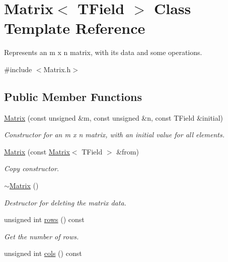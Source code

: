 \hypertarget{classMatrix}{}\section{Matrix$<$ T\+Field $>$ Class Template Reference}
\label{classMatrix}


Represents an m x n matrix, with its data and some operations.  




{\ttfamily \#include $<$Matrix.\+h$>$}

\subsection*{Public Member Functions}
\begin{DoxyCompactItemize}
\item 
\mbox{\hyperlink{classMatrix_aaf53d2ed43916bdff67dde343acc2d9a}{Matrix}} (const unsigned \&m, const unsigned \&n, const T\+Field \&initial)
\begin{DoxyCompactList}\small\item\em Constructor for an m x n matrix, with an initial value for all elements. \end{DoxyCompactList}\item 
\mbox{\hyperlink{classMatrix_ac6bf5bf423a6d56ce31e8659de788c54}{Matrix}} (const \mbox{\hyperlink{classMatrix}{Matrix}}$<$ T\+Field $>$ \&from)
\begin{DoxyCompactList}\small\item\em Copy constructor. \end{DoxyCompactList}\item 
\mbox{\label{classMatrix_a3474dab2c6b05e89bdfaf3270e5081ec}} 
\mbox{\hyperlink{classMatrix_a3474dab2c6b05e89bdfaf3270e5081ec}{$\sim$\+Matrix}} ()
\begin{DoxyCompactList}\small\item\em Destructor for deleting the matrix data. \end{DoxyCompactList}\item 
unsigned int \mbox{\hyperlink{classMatrix_a0e6439550b0aa4f6d66c5a31bfd6405c}{rows}} () const
\begin{DoxyCompactList}\small\item\em Get the number of rows. \end{DoxyCompactList}\item 
unsigned int \mbox{\hyperlink{classMatrix_aec5c893960915183a1bf8eace12a45ac}{cols}} () const

\end{DoxyCompactItemize}
